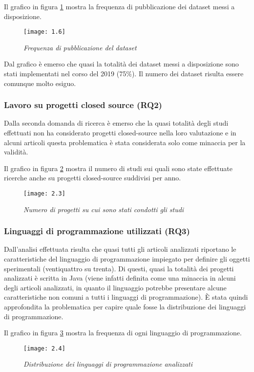 Il grafico in figura \ref{fig:fig.2.2} mostra la frequenza di pubblicazione dei dataset messi a disposizione.
\begin{figure}[h]
	\centering
	\texttt{[image: 1.6]}
	\caption{\emph{Frequenza di pubblicazione del dataset}}
	\label{fig:fig.2.2}
\end{figure}

Dal grafico è emerso che quasi la totalità dei dataset messi a disposizione
sono stati implementati nel corso del 2019 (75\%). Il numero dei dataset risulta essere comunque molto esiguo.

\subsubsection{Lavoro su progetti closed source (RQ2)}
Dalla seconda domanda di ricerca è emerso che la quasi totalità degli studi effettuati non ha considerato progetti closed-source nella loro valutazione e in alcuni articoli questa problematica è stata considerata solo come minaccia per la validità.

Il grafico in figura \ref{fig:fig2.3} mostra il numero di studi sui quali sono state effettuate ricerche anche su progetti closed-source suddivisi per anno.
\newpage
\begin{figure}[h!]
	\centering
	\texttt{[image: 2.3]}
	\caption{\emph{Numero di progetti su cui sono stati condotti gli studi}}
	\label{fig:fig2.3}
\end{figure}
\subsubsection{Linguaggi di programmazione utilizzati (RQ3)}
Dall'analisi effettuata risulta che quasi tutti gli articoli analizzati riportano le caratteristiche del linguaggio di programmazione impiegato per definire gli oggetti
sperimentali (ventiquattro su trenta). Di questi, quasi la totalità dei progetti
analizzati è scritta in Java (viene infatti definita come una minaccia in alcuni degli
articoli analizzati, in quanto il linguaggio potrebbe presentare alcune caratteristiche
non comuni a tutti i linguaggi di programmazione). È stata quindi approfondita la problematica per capire quale fosse la distribuzione dei linguaggi di programmazione.

Il grafico in figura \ref{fig:fig.2.4} mostra la frequenza di ogni linguaggio di programmazione.
\newpage
\begin{figure}[h]
	\centering
	\texttt{[image: 2.4]}
	\caption{\emph{Distribuzione dei linguaggi di programmazione analizzati}}
	\label{fig:fig.2.4}
\end{figure}

